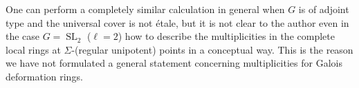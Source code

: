 \documentclass[11pt,reqno]{amsart}
\theoremstyle{definition}
\DeclareMathOperator{\SL}{SL}
\begin{document}
One can perform a completely similar calculation in general when $G$ is of adjoint type and the universal cover is not \'etale, but it is not clear to the author even in the case $G = \SL_2$ ($\ell = 2$) how to describe the multiplicities in the complete local rings at $\Sigma$-(regular unipotent) points in a conceptual way. This is the reason we have not formulated a general statement concerning multiplicities for Galois deformation rings.
































\end{document}
